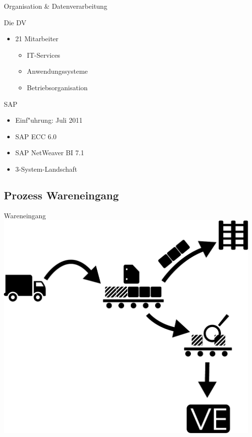 \begin{frame}[<+->]{Organisation \& Datenverarbeitung}
			\begin{block}{Die DV}
				\begin{itemize}
						\item 21 Mitarbeiter
						\begin{itemize}
							\item IT-Services
							\item \alert<6>{Anwendungssysteme}
							\item Betriebsorganisation
						\end{itemize}
				\end{itemize}
			\end{block}
			\pause
			\begin{block}{SAP}
				\begin{itemize}[<+->]
						\item Einf"uhrung: Juli 2011
						\item SAP ECC 6.0
						\item SAP NetWeaver BI 7.1
						\item 3-System-Landschaft
				\end{itemize}
			\end{block}
\end{frame}

\subsection{Prozess Wareneingang}
\begin{frame}{Wareneingang}
 \includegraphics[width=.9\textwidth]{Wareneingang2}
\end{frame}

